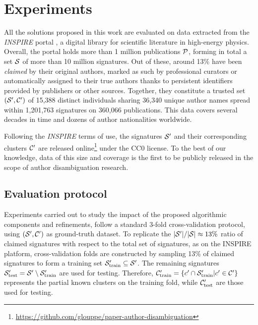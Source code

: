 \documentclass[runningheads,a4paper]{llncs}
\begin{document}

\section{Experiments}
\label{experiments}

All the solutions proposed in this work are evaluated on data extracted from
the \emph{INSPIRE} portal \cite{gentil2009information}, a digital library for scientific literature in
high-energy physics.
Overall, the portal holds more than 1 million publications ${\cal P}$,
forming in total a set ${\cal S}$ of more than 10 million signatures.
Out of these, around 13\% have been \textit{claimed} by their
original authors, marked as such by professional curators or automatically assigned to their true authors thanks
to persistent identifiers provided by publishers or other sources.
Together, they constitute a trusted set $({\cal S}^\prime, {\cal C}^\prime)$ of 15,388 distinct individuals sharing
36,340 unique author names spread within 1,201,763 signatures on 360,066
publications. This data covers several decades in time and dozens of author
nationalities worldwide.

Following the \emph{INSPIRE} terms of use, the signatures ${\cal S}^\prime$ and their
corresponding clusters ${\cal C}^\prime$ are released
online\footnote{\url{https://github.com/glouppe/paper-author-disambiguation}}
under the CC0 license.
To the best of our knowledge, data of this size and coverage is the first to be publicly
released in the scope of author disambiguation research.

\subsection{Evaluation protocol}


Experiments carried out to study the impact of the proposed algorithmic
components and refinements, follow a
standard 3-fold cross-validation protocol, using $({\cal S}^\prime, {\cal
C}^\prime)$ as ground-truth dataset. To replicate the $|{\cal S}^\prime| /
|{\cal S}| \approx 13\%$ ratio of claimed signatures with respect to the total
set of signatures, as on the INSPIRE platform, cross-validation folds are
constructed by sampling 13\% of claimed signatures to form a training set ${\cal
S}_\text{train}^\prime \subseteq {\cal S}^\prime$.
The remaining signatures ${\cal S}_\text{test}^\prime = {\cal S}^\prime \setminus {\cal
S}_\text{train}^\prime$ are used for testing.
Therefore, ${\cal C}_\text{train}^\prime = \{ c^\prime \cap {\cal S}_\text{train}^\prime | c^\prime \in {\cal C}^\prime
\}$ represents the partial known clusters on the training fold, while ${\cal
C}_\text{test}^\prime$ are those used for testing.
\end{document}
